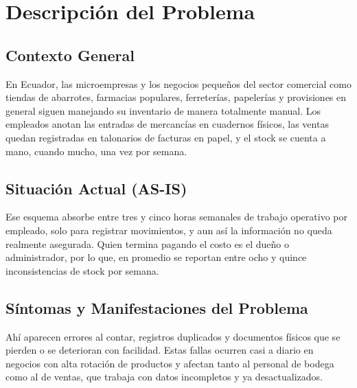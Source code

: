 \documentclass[12pt, letterpaper]{report}
\begin{document}
\listoftables
\newpage

\listoffigures
\newpage


\setcounter{page}{1}


\chapter{Descripción del Problema}

\section{Contexto General}

En Ecuador, las microempresas y los negocios pequeños del sector comercial como tiendas de abarrotes, farmacias populares, ferreterías, papelerías y provisiones en general siguen manejando su inventario de manera totalmente manual. Los empleados anotan las entradas de mercancías en cuadernos físicos, las ventas quedan registradas en talonarios de facturas en papel, y el stock se cuenta a mano, cuando mucho, una vez por semana.

\section{Situación Actual (AS-IS)}

Ese esquema absorbe entre tres y cinco horas semanales de trabajo operativo por empleado, solo para registrar movimientos, y aun así la información no queda realmente asegurada. Quien termina pagando el costo es el dueño o administrador, por lo que, en promedio se reportan entre ocho y quince inconsistencias de stock por semana.

\section{Síntomas y Manifestaciones del Problema}

Ahí aparecen errores al contar, registros duplicados y documentos físicos que se pierden o se deterioran con facilidad. Estas fallas ocurren casi a diario en negocios con alta rotación de productos y afectan tanto al personal de bodega como al de ventas, que trabaja con datos incompletos y ya desactualizados.
\end{document}
